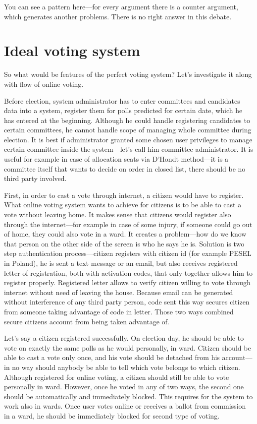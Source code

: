 \documentclass[a4paper,twoside,12pt]{book}
\begin{document}
	You can see a pattern here---for every argument there is a counter argument, which generates another problems. 
	There is no right answer in this debate.

\section{Ideal voting system}

  So what would be features of the perfect voting system? Let's investigate it along with flow of online voting.

  Before election, system administrator has to enter committees and candidates data into a system, register them for polls predicted for certain date, which he has entered at the beginning.
  Although he could handle registering candidates to certain committees, he cannot handle scope of managing whole committee during election. 
  It is best if administrator granted some chosen user privileges to manage certain committee inside the system---let's call him committee administrator.
  It is useful for example in case of allocation seats via D'Hondt method---it is a committee itself that wants to decide on order in closed list, there should be no third party involved.
  
  First, in order to cast a vote through internet, a citizen would have to register. What online voting system wants to achieve for citizens is to be able to cast a vote without leaving home.
  It makes sense that citizens would register also through the internet---for example in case of some injury, if someone could go out of home, they could also vote in a ward. 
  It creates a problem---how do we know that person on the other side of the screen is who he says he is. 
  Solution is two step authentication process---citizen registers with citizen id (for example PESEL in Poland), he is sent a text message or an email,
  but also receives registered letter of registration, both with activation codes, that only together allows him to register properly. 
  Registered letter allows to verify citizen willing to vote through internet without need of leaving the house. 
  Because email can be generated without interference of any third party person, code sent this way secures citizen from someone taking advantage of code in letter.
  Those two ways combined secure citizens account from being taken advantage of.

  Let's say a citizen registered successfully. On election day, he should be able to vote on exactly the same polls as he would personally, in ward.
  Citizen should be able to cast a vote only once, and his vote should be detached from his account---in no way should anybody be able to tell which vote belongs to which citizen.
  Although registered for online voting, a citizen should still be able to vote personally in ward. 
  However, once he voted in any of two ways, the second one should be automatically and immediately blocked. This requires for the system to work also in wards.
  Once user votes online or receives a ballot from commission in a ward, he should be immediately blocked for second type of voting.
\end{document}
